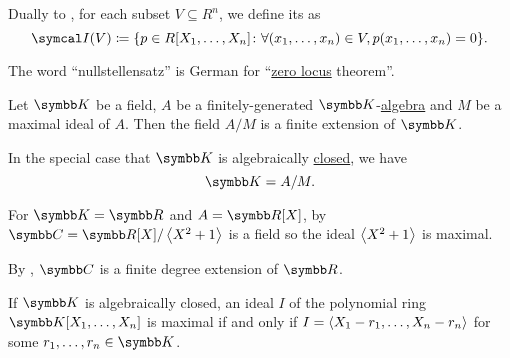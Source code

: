 \begin{definition}\label{def:ideal_of_affine_variety}
  Dually to , for each subset \( V \subseteq R^n \), we define its  as
  \begin{equation*}
    \Cal{I}(V) \coloneqq \{ p \in R[X_1, \ldots, X_n] \colon \forall (x_1, \ldots, x_n) \in V, p(x_1, \ldots, x_n) = 0 \}.
  \end{equation*}
\end{definition}

\begin{remark}\label{rem:nullstelletsatz_etymology}
  The word \enquote{nullstellensatz} is German for \enquote{\hyperref[def:zero_locus]{zero locus} theorem}.
\end{remark}

\begin{theorem}\label{thm:algebraic_nullstellensatz}
  Let \( \BK \) be a field, \( A \) be a finitely-generated \( \BK \)-\hyperref[def:algebra_over_ring]{algebra} and \( M \) be a maximal ideal of \( A \). Then the field \( A / M \) is a finite extension of \( \BK \).

  In the special case that \( \BK \) is algebraically \hyperref[def:algebraically_closed_field]{closed}, we have
  \begin{equation*}
    \BK = A / M.
  \end{equation*}
\end{theorem}

\begin{example}\label{ex:algebraic_nullstellensatz_real_over_complex}
  For \( \BK = \BR \) and \( A = \BR[X] \), by  \( \BC = \BR[X] / \Braket{X^2 + 1} \) is a field so the ideal \( \Braket{X^2 + 1} \) is maximal.

  By , \( \BC \) is a finite degree extension of \( \BR \).
\end{example}

\begin{corollary}\label{thm:closed_field_maximal_ideal_representation}
  If \( \BK \) is algebraically closed, an ideal \( I \) of the polynomial ring \( \BK[X_1, \ldots, X_n] \) is maximal if and only if \( I = \Braket{X_1 - r_1, \ldots, X_n - r_n} \) for some \( r_1, \ldots, r_n \in \BK \).
\end{corollary}

